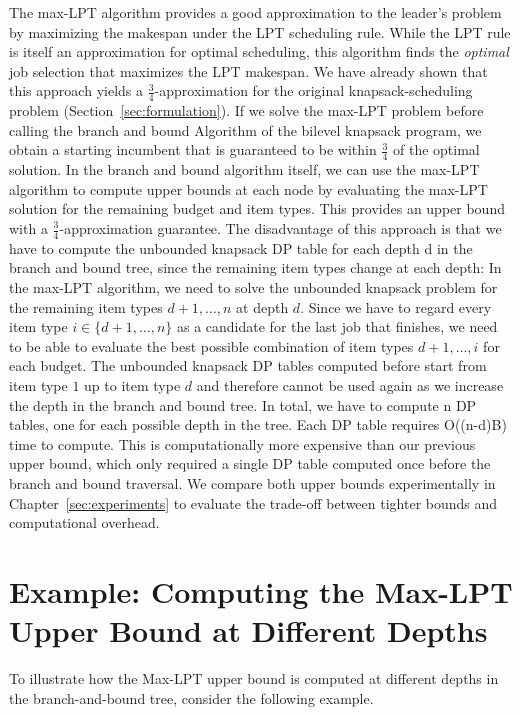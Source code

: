 The max-LPT algorithm provides a good approximation to the leader's problem by maximizing the makespan under the LPT scheduling rule. 
While the LPT rule is itself an approximation for optimal scheduling, this algorithm finds the \emph{optimal} job selection that maximizes the LPT makespan. 
We have already shown that this approach yields a $\frac{3}{4}$-approximation for the original knapsack-scheduling problem (Section~\ref{sec:formulation}). 
If we solve the max-LPT problem before calling the branch and bound Algorithm of the bilevel knapsack program, 
we obtain a starting incumbent that is guaranteed to be within $\frac{3}{4}$ of the optimal solution. 
In the branch and bound algorithm itself, we can use the max-LPT algorithm to compute upper bounds at each node by evaluating the max-LPT solution for the remaining budget and item types. 
This provides an upper bound with a $\frac{3}{4}$-approximation guarantee.
The disadvantage of this approach is that we have to compute the unbounded knapsack DP table for each depth d in the branch and bound tree, since the remaining item types change at each depth:
In the max-LPT algorithm, we need to solve the unbounded knapsack problem for the remaining item types $d+1, \ldots, n$ at depth $d$.
Since we have to regard every item type $i \in \{d+1, \ldots, n\}$ as a candidate for the last job that finishes, we need to be able to evaluate the best possible combination of item types $d+1, \ldots, i$ for each budget. 
The unbounded knapsack DP tables computed before start from item type $1$ up to item type $d$ and therefore cannot be used again as we increase the depth in the branch and bound tree.
In total, we have to compute n DP tables, one for each possible depth in the tree. Each DP table requires O((n-d)B) time to compute.
This is computationally more expensive than our previous upper bound, which only required a single DP table computed once before the branch and bound traversal. 
We compare both upper bounds experimentally in Chapter~\ref{sec:experiments} to evaluate the trade-off between tighter bounds and computational overhead.

\section*{Example: Computing the Max-LPT Upper Bound at Different Depths}

To illustrate how the Max-LPT upper bound is computed at different depths in the branch-and-bound tree, consider the following example.

